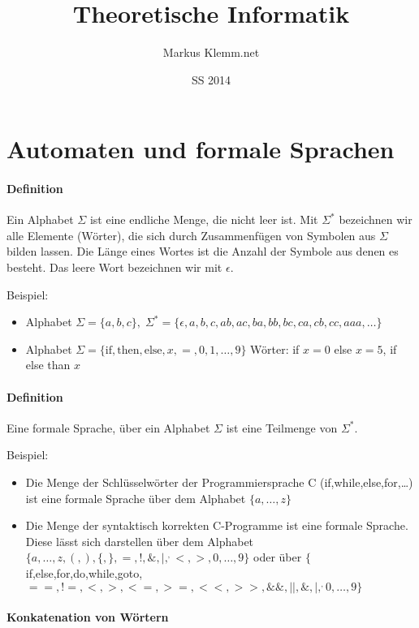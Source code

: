 \documentclass[a4paper]{scrartcl}
\title{Theoretische Informatik}
\date{SS 2014}
\author{Markus Klemm.net}
\begin{document}
\maketitle
\tableofcontents

\section{Automaten und formale Sprachen}
\paragraph{Definition} Ein Alphabet $\Sigma$ ist eine endliche Menge, die nicht leer ist. Mit $\Sigma^*$ bezeichnen wir alle Elemente (Wörter), die sich durch Zusammenfügen von Symbolen aus $\Sigma$ bilden lassen. Die Länge eines Wortes ist die Anzahl der Symbole aus denen es besteht. Das leere Wort bezeichnen wir mit $\epsilon$.

Beispiel: 
\begin{itemize}
\item Alphabet $\Sigma = \{a,b,c\}, \; \Sigma^* = \{\epsilon, a,b,c,ab,ac,ba,bb,bc,ca,cb,cc,aaa,\dots\}$
\item Alphabet $\Sigma = \{\text{if},\text{then},\text{else},x,=,0,1,\dots,9\}$ Wörter: if $x = 0$ else $x = 5$, if else than $x$
\end{itemize}

\paragraph{Definition} Eine formale Sprache, über ein Alphabet $\Sigma$ ist eine Teilmenge von $\Sigma^*$.

Beispiel: 
\begin{itemize}
\item Die Menge der Schlüsselwörter der Programmiersprache C (if,while,else,for,\dots) ist eine formale Sprache über dem Alphabet $\{a,\dots,z\}$
\item Die Menge der syntaktisch korrekten C-Programme ist eine formale Sprache. Diese lässt sich darstellen über dem Alphabet $\{a,\dots,z,(,),\{,\},=,!,\&,|,^,<,>,0,\dots,9\}$ oder über $\{$if,else,for,do,while,goto,$==,!=,<,>,<=,>=,<<,>>,\&\&,||,\&,|,^,0,\dots,9\}$
\end{itemize}

\paragraph{Konkatenation von Wörtern}
\end{document}
